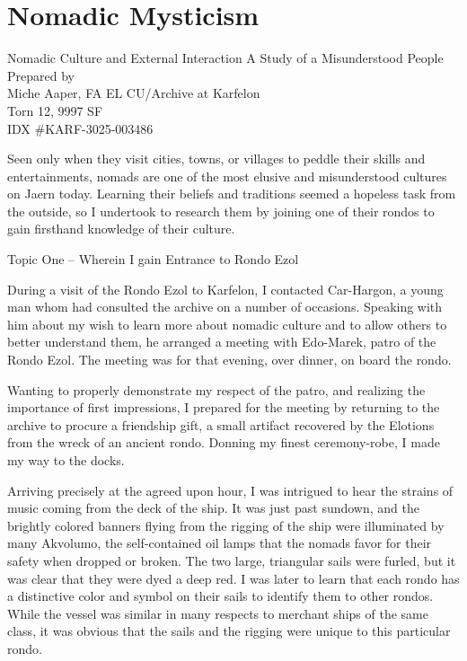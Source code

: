 \chapter{Nomadic Mysticism}
\label{ch:nomad}
\begin{center}
Nomadic Culture and External Interaction
A Study of a Misunderstood People\\
Prepared by\\
Miche Aaper, FA EL CU/Archive at Karfelon\\
Torn 12, 9997 SF\\
IDX \#KARF-3025-003486\\
\end{center}
Seen only when they visit cities, towns, or villages to peddle their skills and entertainments, nomads are one of the most elusive and misunderstood cultures on Jaern today. Learning their beliefs and traditions seemed a hopeless task from the outside, so I undertook to research them by joining one of their rondos to gain firsthand knowledge of their culture.

Topic One – Wherein I gain Entrance to Rondo Ezol

During a visit of the Rondo Ezol to Karfelon, I contacted Car-Hargon, a young man whom had consulted the
archive on a number of occasions. Speaking with him about my wish to learn more about nomadic culture and to allow
others to better understand them, he arranged a meeting with Edo-Marek, patro of the Rondo Ezol. The meeting was for
that evening, over dinner, on board the rondo.

Wanting to properly demonstrate my respect of the patro, and realizing the importance of first impressions, I prepared for the meeting by returning to the archive to procure a friendship gift, a small artifact recovered by the Elotions from the wreck of an ancient rondo. Donning my finest ceremony-robe, I made my way to the docks.

Arriving precisely at the agreed upon hour, I was intrigued to hear the strains of music coming from the deck of the ship. It was just past sundown, and the brightly colored banners flying from the rigging of the ship were illuminated by many Akvolumo, the self-contained oil lamps that the nomads favor for their safety when dropped or broken. The two large, triangular sails were furled, but it was clear that they were dyed a deep red. I was later to learn that each rondo has a distinctive color and symbol on their sails to identify them to other rondos. While the vessel was similar in many respects to merchant ships of the same class, it was obvious that the sails and the rigging were unique to this particular rondo.

